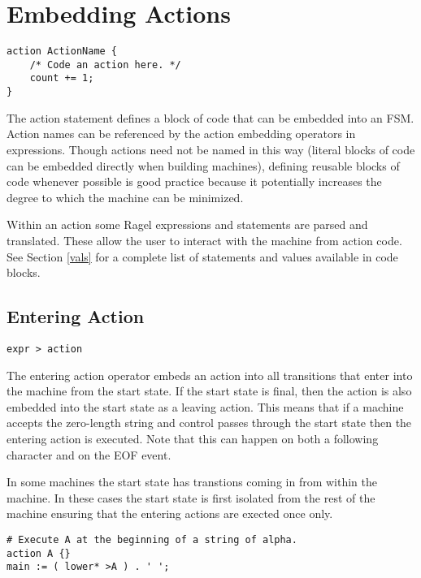 \documentclass[letterpaper,11pt,oneside]{book}
\newcommand{\verbspace}{\vspace{10pt}}
\newenvironment{inline_code}{\def\baselinestretch{1}\vspace{12pt}\small}{}
\begin{document}
\section{Embedding Actions}

\begin{verbatim}
action ActionName {
    /* Code an action here. */
    count += 1;
}
\end{verbatim}
\verbspace

The action statement defines a block of code that can be embedded into an FSM.
Action names can be referenced by the action embedding operators in
expressions. Though actions need not be named in this way (literal blocks
of code can be embedded directly when building machines), defining reusable
blocks of code whenever possible is good practice because it potentially increases the
degree to which the machine can be minimized. 

Within an action some Ragel expressions and statements are parsed and
translated. These allow the user to interact with the machine from action code.
See Section \ref{vals} for a complete list of statements and values available
in code blocks. 

\subsection{Entering Action}

\verb|expr > action| 
\verbspace

The entering action operator embeds an action into all transitions
that enter into the machine from the start state. If the start state is final,
then the action is also embedded into the start state as a leaving action. This
means that if a machine accepts the zero-length string and control passes
through the start state then the entering action is executed. Note
that this can happen on both a following character and on the EOF event.

In some machines the start state has transtions coming in from within the
machine. In these cases the start state is first isolated from the rest of the
machine ensuring that the entering actions are exected once only.

\verbspace

% GENERATE: exstact
\begin{inline_code}
\begin{verbatim}
# Execute A at the beginning of a string of alpha.
action A {}
main := ( lower* >A ) . ' ';
\end{verbatim}
\end{inline_code}
\end{document}
